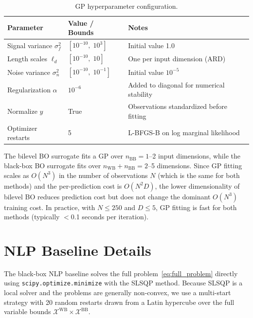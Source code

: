 \documentclass[12pt,a4paper]{article}%
\theoremstyle{plain}%
\theoremstyle{remark}%
\theoremstyle{definition}%
\def\WB{\mathrm{WB}}
\def\BB{\mathrm{BB}}
\begin{document}
\begin{appendices}
\begin{table}[htbp]
\centering
\caption{GP hyperparameter configuration.}
\label{tab:gp_hyperparams}
\begin{tabular}{@{}lll@{}}
\toprule
\textbf{Parameter} & \textbf{Value / Bounds} & \textbf{Notes} \\
\midrule
Signal variance $\sigma_f^2$ & $[10^{-10},\; 10^3]$ & Initial value 1.0 \\
Length scales $\ell_d$ & $[10^{-10},\; 10]$ & One per input dimension (ARD) \\
Noise variance $\sigma_n^2$ & $[10^{-10},\; 10^{-1}]$ & Initial value $10^{-5}$ \\
Regularization $\alpha$ & $10^{-6}$ & Added to diagonal for numerical stability \\
Normalize $y$ & True & Observations standardized before fitting \\
Optimizer restarts & 5 & L-BFGS-B on log marginal likelihood \\
\bottomrule
\end{tabular}
\end{table}

The bilevel BO surrogate fits a GP over $n_{\BB} = 1$--2 input dimensions, while the black-box BO surrogate fits over $n_{\WB}+n_{\BB} = 2$--5 dimensions. Since GP fitting scales as $O(N^3)$ in the number of observations $N$ (which is the same for both methods) and the per-prediction cost is $O(N^2 D)$, the lower dimensionality of bilevel BO reduces prediction cost but does not change the dominant $O(N^3)$ training cost. In practice, with $N \leq 250$ and $D \leq 5$, GP fitting is fast for both methods (typically $<$0.1 seconds per iteration).

\section{NLP Baseline Details}\label{sec:nlp_details}

The black-box NLP baseline solves the full problem~\eqref{eq:full_problem} directly using \texttt{scipy.optimize.minimize} with the SLSQP method. Because SLSQP is a local solver and the problems are generally non-convex, we use a multi-start strategy with 20 random restarts drawn from a Latin hypercube over the full variable bounds $\mathcal{X}^{\WB} \times \mathcal{X}^{\BB}$.


\end{appendices}
\end{document}
